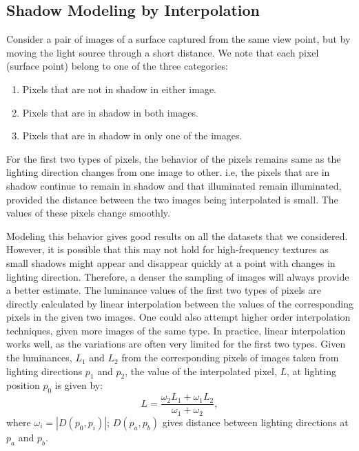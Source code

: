 


\subsection{Shadow Modeling by Interpolation}
Consider a pair of images of a surface captured from the same view point, but by
moving the light source through a short distance. We note that each pixel
(surface point) belong to one of the three categories:
\begin{enumerate}
\item Pixels that are not in shadow in either image.
\item Pixels that are in shadow in both images.
\item Pixels that are in shadow in only one of the images.
\end{enumerate}

For the first two types of pixels, the behavior of the pixels remains same as
the lighting direction changes from one image to other. i.e, the pixels that are
in shadow continue to remain in shadow and that illuminated remain illuminated,
provided the distance between the two images being interpolated is small. The
values of these pixels change smoothly.

Modeling this behavior gives good results on all the datasets that we
considered. However, it is possible that this may not hold for high-frequency
textures as small shadows might appear and disappear quickly at a point with
changes in lighting direction. Therefore, a denser the sampling of images will
always provide a better estimate. The luminance values of the first two types of
pixels are directly calculated by linear interpolation between the values of the
corresponding pixels in the given two images. One could also attempt higher
order interpolation techniques, given more images of the same type. In practice,
linear interpolation works well, as the variations are often very limited for
the first two types. Given the luminances, $L_1$ and $L_2$ from the
corresponding pixels of images taken from lighting directions $p_1$ and $p_2$,
the value of the interpolated pixel, $L$, at lighting position $p_0$ is given
by:
\begin{equation}
L=\frac{\omega_2 L_1 + \omega_1 L_2}{\omega_1 + \omega_2},
\end{equation}
where $\omega_i = |D(p_0,p_i)|$; $D(p_a,p_b)$ gives distance between lighting
directions at $p_a$ and $p_b$.

